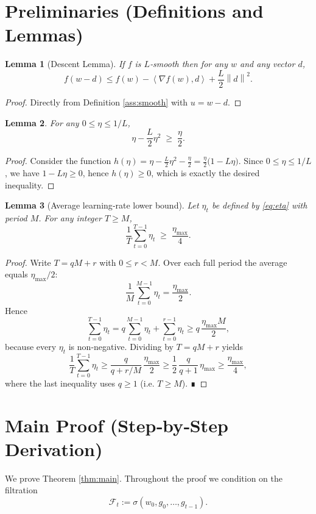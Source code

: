 \documentclass{article}
\newtheorem{lemma}{Lemma}
\newcommand{\norm}[1]{\left\|#1\right\|}
\newcommand{\inner}[2]{\left\langle #1,#2\right\rangle}
\begin{document}
\newpage
\section*{Preliminaries (Definitions and Lemmas)}
\begin{lemma}[Descent Lemma]\label{lem:descent}
If $f$ is $L$‑smooth then for any $w$ and any vector $d$,
\[
f(w-d)\le f(w)-\inner{\nabla f(w)}{d}+\frac{L}{2}\norm{d}^{2}.
\]
\end{lemma}
\begin{proof}
Directly from Definition \ref{ass:smooth} with $u=w-d$.
\end{proof}

\begin{lemma}\label{lem:quadratic}
For any $0\le \eta\le 1/L$,
\[
\eta-\frac{L}{2}\eta^{2}\;\ge\;\frac{\eta}{2}.
\]
\end{lemma}
\begin{proof}
Consider the function $h(\eta)=\eta-\frac{L}{2}\eta^{2}-\frac{\eta}{2}
= \frac{\eta}{2}\bigl(1-L\eta\bigr)$.  
Since $0\le\eta\le 1/L$, we have $1-L\eta\ge0$, hence $h(\eta)\ge0$, which is exactly the desired inequality.
\end{proof}

\begin{lemma}[Average learning‑rate lower bound]\label{lem:avg-eta}
Let $\eta_t$ be defined by \eqref{eq:eta} with period $M$. For any integer $T\ge M$,
\[
\frac{1}{T}\sum_{t=0}^{T-1}\eta_t\;\ge\;\frac{\eta_{\max}}{4}.
\]
\end{lemma}
\begin{proof}
Write $T = qM+r$ with $0\le r<M$. Over each full period the average equals $\eta_{\max}/2$:
\[
\frac{1}{M}\sum_{t=0}^{M-1}\eta_t
= \frac{\eta_{\max}}{2}.
\]
Hence
\[
\sum_{t=0}^{T-1}\eta_t
= q\sum_{t=0}^{M-1}\eta_t+\sum_{t=0}^{r-1}\eta_t
\ge q\,\frac{\eta_{\max}M}{2},
\]
because every $\eta_t$ is non‑negative. Dividing by $T=qM+r$ yields
\[
\frac{1}{T}\sum_{t=0}^{T-1}\eta_t
\ge \frac{q}{q+r/M}\,\frac{\eta_{\max}}{2}
\ge \frac{1}{2}\,\frac{q}{q+1}\,\eta_{\max}
\ge \frac{\eta_{\max}}{4},
\]
where the last inequality uses $q\ge1$ (i.e. $T\ge M$). ∎
\end{proof}

\section*{Main Proof (Step‑by‑Step Derivation)}
We prove Theorem \ref{thm:main}. Throughout the proof we condition on the filtration 
\[
\mathcal{F}_t:=\sigma(w_0,g_0,\dots,g_{t-1}).
\]
\end{document}
